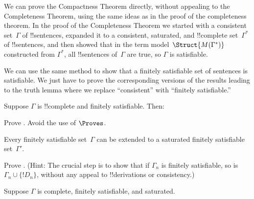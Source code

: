 \documentclass[../../../include/open-logic-section]{subfiles}
\begin{document}

We can prove the Compactness Theorem directly, without appealing to
the Completeness Theorem, using the same ideas as in the proof of the
completeness theorem.  In the proof of the Completeness Theorem we
started with a consistent set~$\Gamma$ of !!{sentence}s, expanded it to a
consistent, saturated, and !!{complete} set~$\Gamma^*$ of
!!{sentence}s, and then showed that in the term
model~$\Struct{M(\Gamma^*)}$ constructed from $\Gamma^*$, all
!!{sentence}s of~$\Gamma$ are true, so $\Gamma$ is satisfiable.

We can use the same method to show that a finitely satisfiable set of
sentences is satisfiable. We just have to prove the corresponding
versions of the results leading to the truth lemma where we replace
``consistent'' with ``finitely satisfiable.''

\begin{prop}
Suppose $\Gamma$ is !!{complete} and finitely satisfiable. Then:
\begin{enumerate}


\end{enumerate}
\end{prop}

\begin{prop}
Prove . Avoid the use of $\Proves$.
\end{prop}

\begin{lem}
 Every finitely satisfiable set~$\Gamma$ can
be extended to a saturated finitely satisfiable set~$\Gamma'$.
\end{lem}

\begin{prob}
Prove . (Hint: The crucial step
is to show that if $\Gamma_n$ is finitely satisfiable, so is $\Gamma_n
\cup \{!D_n\}$, without any appeal to !!{derivation}s or consistency.)
\end{prob}

\begin{prop}
Suppose $\Gamma$ is complete, finitely satisfiable, and saturated.
\end{prop}
\end{document}
